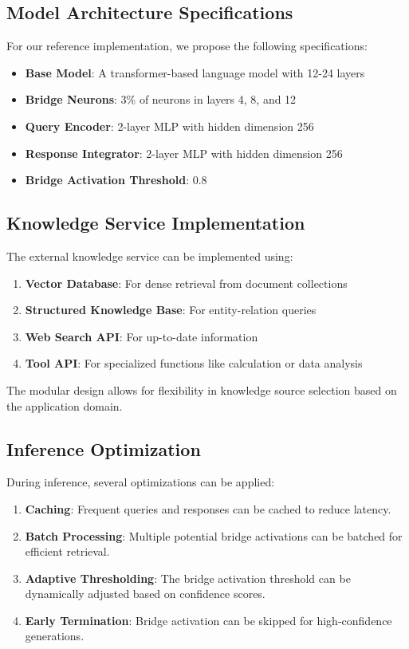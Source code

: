 \documentclass[9pt,a4paper,twocolumn,twoside]{tau-class/tau}
\begin{document}
\subsection{Model Architecture Specifications}

    For our reference implementation, we propose the following specifications:

    \begin{itemize}
        \item \textbf{Base Model}: A transformer-based language model with 12-24 layers
        \item \textbf{Bridge Neurons}: 3\% of neurons in layers 4, 8, and 12
        \item \textbf{Query Encoder}: 2-layer MLP with hidden dimension 256
        \item \textbf{Response Integrator}: 2-layer MLP with hidden dimension 256
        \item \textbf{Bridge Activation Threshold}: 0.8
    \end{itemize}

\subsection{Knowledge Service Implementation}

    The external knowledge service can be implemented using:

    \begin{enumerate}
        \item \textbf{Vector Database}: For dense retrieval from document collections
        \item \textbf{Structured Knowledge Base}: For entity-relation queries
        \item \textbf{Web Search API}: For up-to-date information
        \item \textbf{Tool API}: For specialized functions like calculation or data analysis
    \end{enumerate}

    The modular design allows for flexibility in knowledge source selection based on the application domain.

\subsection{Inference Optimization}

    During inference, several optimizations can be applied:

    \begin{enumerate}
        \item \textbf{Caching}: Frequent queries and responses can be cached to reduce latency.
        \item \textbf{Batch Processing}: Multiple potential bridge activations can be batched for efficient retrieval.
        \item \textbf{Adaptive Thresholding}: The bridge activation threshold can be dynamically adjusted based on confidence scores.
        \item \textbf{Early Termination}: Bridge activation can be skipped for high-confidence generations.
    \end{enumerate}
\end{document}
